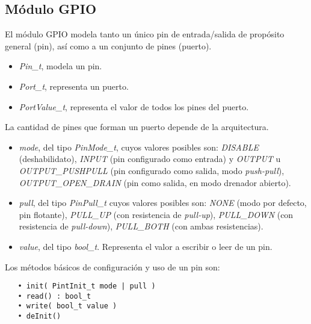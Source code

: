 \subsection{Módulo GPIO}

El módulo GPIO modela tanto un único pin de entrada/salida de propósito general (pin), así como a un conjunto de pines (puerto). 


\begin{itemize}
\item
\emph{Pin\_t}, modela un pin.
\item
\emph{Port\_t}, representa un puerto.
\item
\emph{PortValue\_t}, representa el valor de todos los pines del puerto.
\end{itemize}

La cantidad de pines que forman un puerto depende de la arquitectura.


\begin{itemize}
\item
\emph{mode}, del tipo \emph{PinMode\_t}, cuyos valores posibles son: \emph{DISABLE} (deshabilidato), \emph{INPUT} (pin configurado como entrada) y \emph{OUTPUT} u \emph{OUTPUT\_PUSHPULL} (pin configurado como salida, modo \emph{push-pull}), \emph{OUTPUT\_OPEN\_DRAIN} (pin como salida, en modo drenador abierto).
\item
\emph{pull}, del tipo \emph{PinPull\_t} cuyos valores posibles son: \emph{NONE} (modo por defecto, pin flotante), \emph{PULL\_UP} (con resistencia de \emph{pull-up}), \emph{PULL\_DOWN} (con resistencia de \emph{pull-down}), \emph{PULL\_BOTH} (con ambas resistencias).
\item
\emph{value}, del tipo \emph{bool\_t}. Representa el valor a escribir o leer de un pin.
\end{itemize}


Los métodos básicos de configuración y uso de un pin son:

\begin{verbatim}
   • init( PintInit_t mode | pull )
   • read() : bool_t
   • write( bool_t value )
   • deInit()
\end{verbatim}


